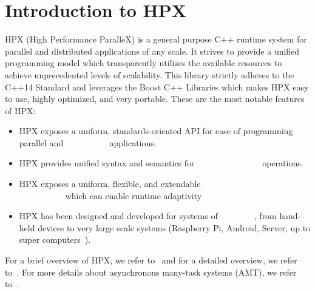 \chapter{Introduction to HPX}
HPX (High Performance ParalleX) is a general purpose C++ runtime system for parallel and distributed applications of any scale. It strives to provide a unified programming model which transparently utilizes the available resources to achieve unprecedented levels of scalability.  This library strictly adheres to the C++14 Standard and leverages the Boost C++ Libraries which makes HPX easy to use, highly optimized, and very portable. These are the most notable features of HPX:
\vspace{0.25cm}
\begin{itemize}
\item HPX exposes a uniform, standards-oriented API for ease of programming parallel and \textcolor{azure}{distributed} applications.
\item HPX provides unified syntax and semantics for \textcolor{azure}{local and remote} operations.
\item HPX exposes a uniform, flexible, and extendable \textcolor{azure}{performance counter framework}~\cite{grubel2016dynamic,grubel2016using} which can enable runtime adaptivity
\item HPX has been designed and developed for systems of \textcolor{azure}{any scale}, from hand-held devices to very large scale systems (Raspberry Pi, Android, Server, up to super computers~\cite{daiss2019piz,heller2019harnessing}).
\end{itemize}
\vspace{0.25cm}
For a brief overview of HPX, we refer to~\cite{heller2017hpx} and for a detailed overview, we refer to~\cite{heller2019extending}. For more details about asynchronous many-task systems (AMT), we refer to~\cite{thoman2018taxonomy}.

